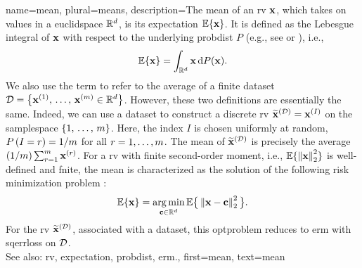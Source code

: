 {name={mean}, plural={means},
	description={The  mean of an \gls{rv} ${\bf x}$, which takes 
 		on values in a \gls{euclidspace} $\mathbb{R}^{d}$, is its 
 		\gls{expectation} $\mathbb{E}\{{\bf x}\}$. It is defined as the Lebesgue 
 		integral of ${\bf x}$ with respect to the underlying \gls{probdist} $P$ (e.g., 
		see \cite{RudinBookPrinciplesMatheAnalysis} or \cite{BillingsleyProbMeasure}), i.e.,
		\[
			\mathbb{E}\{{\bf x}\} = \int_{\mathbb{R}^{d}} {\bf x} \, \mathrm{d}P({\bf x}).
		\]  
		We also use the term to refer to the average of a finite \gls{dataset}
		$\mathcal{D} = \left\{ {\bf x}^{(1)}, \,\ldots, \,{\bf x}^{(m)} \in \mathbb{R}^{d}\right\}$. 
		However, these two definitions are essentially the same. Indeed, we can use 
		a \gls{dataset} to construct a discrete \gls{rv} $\widetilde{{\bf x}}^{(\mathcal{D})}={\bf x}^{(I)}$ on 
		the \gls{samplespace} $\{1, \,\ldots, \,m\}$. Here, the index $I$ is 
		chosen uniformly at random, $P\left(I=r\right)=1/m$ for all 
		$r=1,\ldots,m$. The mean of $\widetilde{{\bf x}}^{(\mathcal{D})}$ is 
		precisely the average $({1}/{m}) \sum_{r=1}^{m} {\bf x}^{(r)}$.
		For a \gls{rv} with finite second-order moment, i.e., 
		$\mathbb{E}\{ \left\Vert {{\bf x}} \right\Vert_{2}^{2} \}$ is well-defined and fnite, 
		the mean is characterized as the solution of the 
		following \gls{risk} minimization problem \cite{BertsekasProb}:
		\[
			\mathbb{E}\{{\bf x}\} = \operatorname*{arg\,min}_{{\bf c} \in \mathbb{R}^{d}} 
			\mathbb{E} \big\{\left\Vert {{\bf x}- {\bf c}} \right\Vert_{2}^{2}\big \}.
		\]
		For the \gls{rv} $\widetilde{{\bf x}}^{(\mathcal{D})}$, associated with a \gls{dataset}, 
		this \gls{optproblem} reduces to \gls{erm} with \gls{sqerrloss} on $\mathcal{D}$. 
		\\ 
		See also: \gls{rv}, \gls{expectation}, \gls{probdist}, \gls{erm}.}, 
	first={mean}, 
	text={mean} 
}

